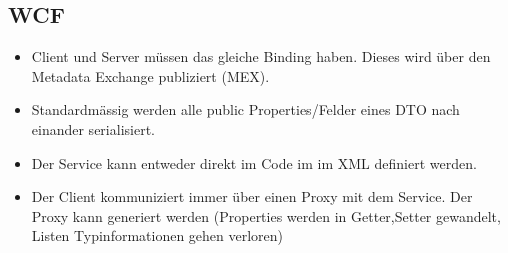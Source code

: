 \subsection{WCF}
\begin{itemize}
	\item Client und Server müssen das gleiche Binding haben. Dieses wird über den Metadata Exchange publiziert (MEX).
	\item Standardmässig werden alle public Properties/Felder eines DTO nach einander serialisiert.
	\item Der Service kann entweder direkt im Code im im XML definiert werden.
	\item Der Client kommuniziert immer über einen Proxy mit dem Service. Der Proxy kann generiert werden (Properties werden in Getter,Setter gewandelt, Listen Typinformationen gehen verloren)
\end{itemize}

